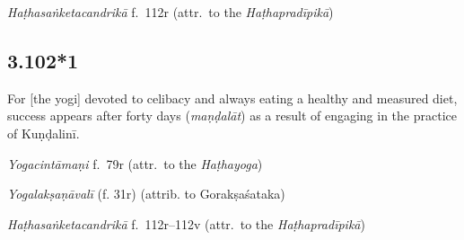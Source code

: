 \begin{ekdosis}
\begin{testimonia}[hp03_102]
\emph{Haṭhasaṅketacandrikā} f.~112r (attr.~to the \emph{Haṭhapradīpikā})
\begin{versinnote}
\end{versinnote}
\end{testimonia}



\subsection*{3.102*1}
\begin{translation}[hp03_102_1]
For [the yogi] devoted to celibacy and always eating a healthy and measured diet, success appears after forty days (\emph{maṇḍalāt}) as a result of engaging in the practice of Kuṇḍalinī.
\end{translation}


\begin{testimonia}[hp03_102_1]
\emph{Yogacintāmaṇi} f.~79r (attr.~to the \emph{Haṭhayoga})
\begin{versinnote}
\end{versinnote}

\emph{Yogalakṣaṇāvalī} (f. 31r)  (attrib. to Gorakṣaśataka)
\begin{versinnote}
\end{versinnote}

\emph{Haṭhasaṅketacandrikā}  f.~112r--112v (attr.~to the \emph{Haṭhapradīpikā})
\begin{versinnote}
\end{versinnote}
\end{testimonia}


\end{ekdosis}
